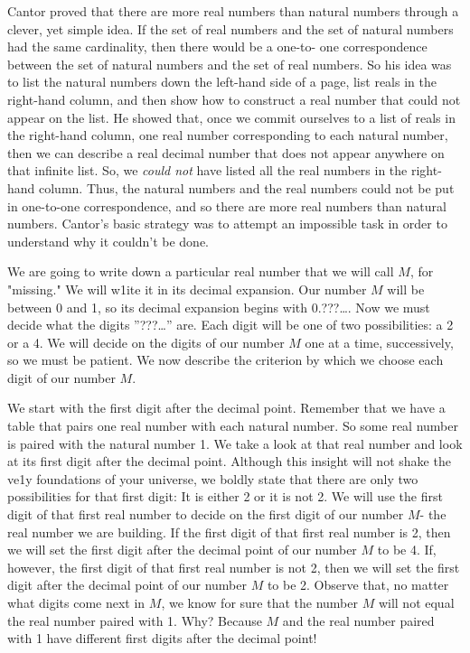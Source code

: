 Cantor proved that there are more real numbers than natural numbers through a clever, yet simple idea. If the set of real numbers and the set of natural numbers had the same cardinality, then there would be a one-to- one correspondence between the set of natural numbers and the set of real numbers. So his idea was to list the natural numbers down the left-hand side of a page, list reals in the right-hand column, and then show how to construct a real number that could not appear on the list. He showed that, once we commit ourselves to a list of reals in the right-hand column, one real number corresponding to each natural number, then we can describe a real decimal number that does not appear anywhere on that infinite list. So, we \emph{could not} have listed all the real numbers in the right-hand column. Thus, the natural numbers and the real numbers could not be put in one-to-one correspondence, and so there are more real numbers than natural numbers. Cantor's basic strategy was to attempt an impossible task in order to understand why it couldn't be done. 

We are going to write down a particular real number that we will call $M$, for "missing." We will w1ite it in its decimal expansion. Our number $M$ will be between 0 and 1, so its decimal expansion begins with 0.???\dots. Now we must decide what the digits ''???\dots'' are. Each digit will be one of two possibilities: a 2 or a 4. We will decide on the digits of our number $M$ one at a time, successively, so we must be patient. We now describe the criterion by which we choose each digit of our number $M$.

\ifsolns
We start with the first digit after the decimal point. Remember that we have a table that pairs one real number with each natural number. So some real number is paired with the natural number 1. We take a look at that real number and look at its first digit after the decimal point. Although this insight will not shake the ve1y foundations of your universe, we boldly state that there are only two possibilities for that first digit: It is either 2 or it is not 2. We will use the first digit of that first real number to decide on the first digit of our number $M$- the real number we are building. If the first digit of that first real number is 2, then we will set the first digit after the decimal point of our number $M$ to be 4. If, however, the first digit of that first real number is not 2, then we will set the first digit after the decimal point of our number $M$ to be 2. Observe that, no matter what digits come next in $M$, we know for sure that the number $M$ will not equal the real number paired with 1. Why? Because $M$ and the real number paired with 1 have different first digits after the decimal point!

